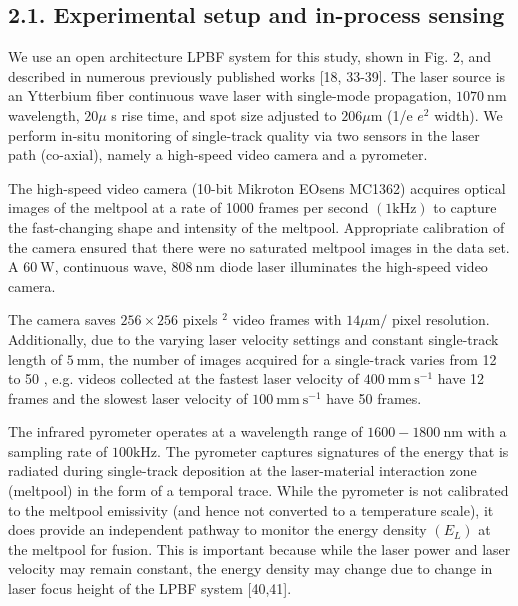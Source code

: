 \documentclass[10pt]{article}
\begin{document}
\subsection*{2.1. Experimental setup and in-process sensing}
We use an open architecture LPBF system for this study, shown in Fig. 2, and described in numerous previously published works [18, 33-39]. The laser source is an Ytterbium fiber continuous wave laser with single-mode propagation, $1070 \mathrm{~nm}$ wavelength, $20 \mu$ s rise time, and spot size adjusted to $206 \mu \mathrm{m}$ (1/e $e^{2}$ width). We perform in-situ monitoring of single-track quality via two sensors in the laser path (co-axial), namely a high-speed video camera and a pyrometer.

The high-speed video camera (10-bit Mikroton EOsens MC1362) acquires optical images of the meltpool at a rate of 1000 frames per second $(1 \mathrm{kHz})$ to capture the fast-changing shape and intensity of the meltpool. Appropriate calibration of the camera ensured that there were no saturated meltpool images in the data set. A $60 \mathrm{~W}$, continuous wave, $808 \mathrm{~nm}$ diode laser illuminates the high-speed video camera.

The camera saves $256 \times 256$ pixels $^{2}$ video frames with $14 \mu \mathrm{m} /$ pixel resolution. Additionally, due to the varying laser velocity settings and constant single-track length of $5 \mathrm{~mm}$, the number of images acquired for a single-track varies from 12 to 50 , e.g. videos collected at the fastest laser velocity of $400 \mathrm{~mm} \mathrm{~s}^{-1}$ have 12 frames and the slowest laser velocity of $100 \mathrm{~mm} \mathrm{~s}^{-1}$ have 50 frames.

The infrared pyrometer operates at a wavelength range of $1600-1800 \mathrm{~nm}$ with a sampling rate of $100 \mathrm{kHz}$. The pyrometer captures signatures of the energy that is radiated during single-track deposition at the laser-material interaction zone (meltpool) in the form of a temporal trace. While the pyrometer is not calibrated to the meltpool emissivity (and hence not converted to a temperature scale), it does provide an independent pathway to monitor the energy density $\left(E_{L}\right)$ at the meltpool for fusion. This is important because while the laser power and laser velocity may remain constant, the energy density may change due to change in laser focus height of the LPBF system [40,41].
\end{document}
